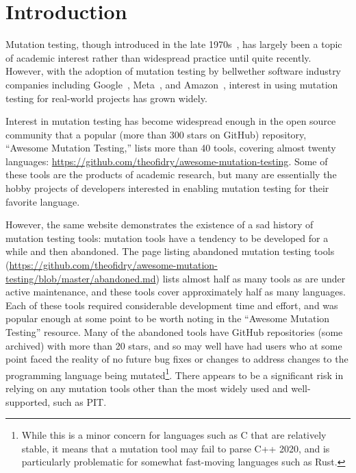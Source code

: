 \documentclass[sigconf,review, anonymous]{acmart}
\begin{document}
\maketitle



\section{Introduction}

Mutation testing, though introduced in the late
1970s~\cite{demillo1978hints,mathur2012foundations,demillo1978hints},
has largely been a topic of academic interest rather than widespread
practice until quite recently.  However, with the adoption of mutation
testing by bellwether software industry companies including
Google~\cite{GoogleMut}, Meta~\cite{BellerFacebookMutation}, and
Amazon~\cite{AmazonMut}, interest in using mutation testing for
real-world projects has grown widely.

Interest in mutation testing has become widespread enough in the open
source community that a popular (more than 300 stars on GitHub)
repository, ``Awesome Mutation Testing,'' lists more than 40 tools,
covering almost twenty languages:
\url{https://github.com/theofidry/awesome-mutation-testing}.  Some of
these tools are the products of academic research, but many are
essentially the hobby projects of developers interested in enabling
mutation testing for their favorite language.

However, the same website demonstrates the existence of a sad history
of mutation testing tools: mutation tools have a tendency to be
developed for a while and then abandoned.   The page listing abandoned
mutation testing tools
(\url{https://github.com/theofidry/awesome-mutation-testing/blob/master/abandoned.md})
lists almost half as many tools as are under active maintenance, and
these tools cover approximately half as many languages.  Each of these
tools required considerable development time and effort, and was
popular enough at some point to be worth noting in the ``Awesome
Mutation Testing'' resource.  Many of the abandoned tools have GitHub
repositories (some archived) with more than 20 stars, and so may well
have had users who at some point faced the reality of no future bug
fixes or changes to address changes to the programming language being
mutated\footnote{While this is a minor concern for languages such as C
  that are relatively stable, it means that a mutation tool may fail
  to parse C++ 2020, and is particularly problematic for somewhat
  fast-moving languages such as Rust.}.  There
appears to be a significant risk in relying on any mutation tools other
than the most widely used and well-supported, such as PIT.
\end{document}
